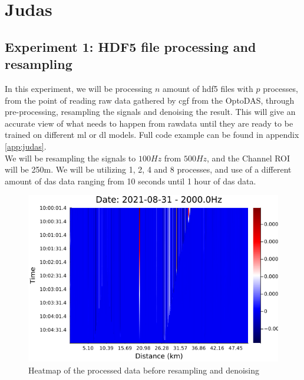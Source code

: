 \section{Judas}
\label{res:Judas}


\subsection{Experiment 1: HDF5 file processing and resampling}

In this experiment, we will be processing $n$ amount of \acrshort{hdf5} files with $p$ processes, from the point of reading raw data gathered by \acrshort{cgf} from the OptoDAS, through pre-processing, resampling the signals and denoising the result. This will give an accurate view of what needs to happen from rawdata until they are ready to be trained on different \acrshort{ml} or \acrshort{dl} models. Full code example can be found in appendix \ref{app:judas}. \\

We will be resampling the signals to $100Hz$ from $500Hz$, and the Channel ROI will be 250m. We will be utilizing 1, 2, 4 and 8 processes, and use of a different amount of \acrshort{das} data ranging from 10 seconds until 1 hour of \acrshort{das} data.

\begin{figure}[!h]
    \centering
    \includegraphics[width=0.8\linewidth]{figures/heatmap_das_test.png}
    \caption{Heatmap of the processed data before resampling and denoising}
    \label{fig:dasoutput}
\end{figure}




